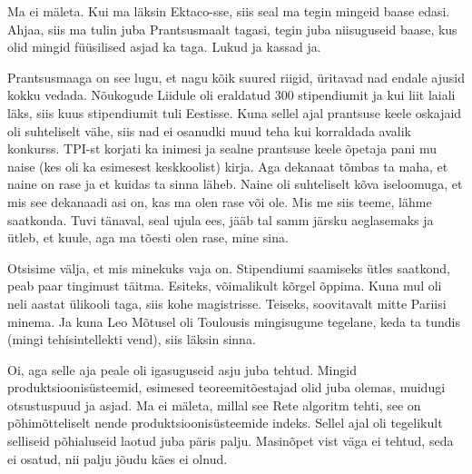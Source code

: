 
Ma ei mäleta. Kui ma läksin Ektaco-sse, siis seal ma tegin 
mingeid baase edasi. Ahjaa, siis ma tulin juba Prantsusmaalt tagasi, tegin juba 
niisuguseid baase, kus olid mingid füüsilised asjad ka taga. Lukud ja kassad ja.


Prantsusmaaga on see lugu, et nagu kõik suured riigid, üritavad nad endale ajusid 
kokku vedada. Nõukogude Liidule oli eraldatud 300 stipendiumit ja kui liit laiali läks, 
siis kuus stipendiumit tuli Eestisse. Kuna sellel ajal prantsuse keele  
oskajaid oli suhteliselt vähe, siis nad ei osanudki muud teha kui korraldada 
avalik konkurss. TPI-st korjati ka inimesi ja sealne prantsuse keele õpetaja 
pani mu naise (kes oli ka esimesest keskkoolist) kirja. Aga dekanaat tõmbas ta 
maha, et naine on rase ja et kuidas ta sinna läheb. Naine oli suhteliselt kõva 
iseloomuga, et mis see  dekanaadi asi on, kas ma olen rase või ole. Mis me siis 
teeme, lähme saatkonda. Tuvi tänaval, seal ujula ees, jääb tal samm järsku 
aeglasemaks ja ütleb, et kuule, aga ma tõesti olen rase, mine sina.

Otsisime välja, et mis minekuks vaja on. Stipendiumi saamiseks ütles saatkond, 
peab paar tingimust täitma. Esiteks, võimalikult kõrgel õppima. Kuna mul oli 
neli aastat ülikooli taga, siis kohe magistrisse. Teiseks, soovitavalt  mitte 
Pariisi minema. Ja kuna Leo Mõtusel oli Toulousis 
mingisugune tegelane, keda ta tundis (mingi tehisintellekti vend),  siis läksin 
sinna.
                

Oi, aga selle aja peale oli igasuguseid asju juba  tehtud. Mingid 
produktsioonisüsteemid,  esimesed teoreemitõestajad 
olid juba olemas, muidugi  otsustuspuud ja asjad. Ma ei mäleta, millal see 
Rete  algoritm tehti, see 
on põhimõtteliselt nende produktsioonisüsteemide indeks. Sellel ajal oli 
tegelikult selliseid põhialuseid laotud juba päris palju. Masinõpet vist väga 
ei tehtud, seda ei osatud, nii palju jõudu käes ei olnud.
                 
